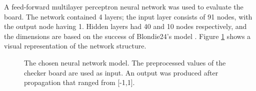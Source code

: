 \documentclass[12pt,a4paper]{article}
\begin{document}
        A feed-forward multilayer perceptron neural network was used to evaluate the board. The network contained 4 layers; the input layer consists of 91 nodes, with the output node having 1. Hidden layers had 40 and 10 nodes respectively, and the dimensions are based on the success of Blondie24's model \cite{chellapilla_evolving_1999}. Figure \ref{nnmodel} shows a visual representation of the network structure.

        \begin{figure}[ht!]
            \centering
            \caption{The chosen neural network model. The preprocessed values of the checker board are used as input. An output was produced after propagation that ranged from [-1,1]. \label{nnmodel}}
            \vspace{10pt}

\end{figure}
\end{document}
